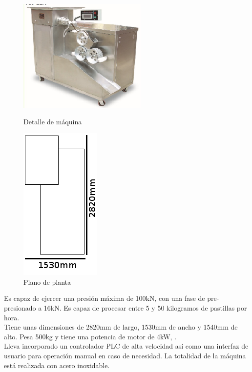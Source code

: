 	\begin{figure}[htp]
		\begin{minipage}{.48\textwidth}
			\centering
			\includegraphics[scale=1]{Datasheets/2MaquinaPrensadoFoto.png}
			\caption{Detalle de máquina}
			\label{fig:testa}
		\end{minipage}
		\begin{minipage}{.48\textwidth}
			\centering
			\includegraphics[scale=0.8]{Datasheets/Miniaturas/compresion.png}
			\caption{Plano de planta}
			\label{fig:testb}
		\end{minipage}
	\end{figure}
		

	Es capaz de ejercer una presión máxima de 100kN, con una fase de pre-presionado a 16kN. Es capaz de procesar entre 5 y 50 kilogramos de pastillas por hora. \\

	Tiene unas dimensiones de 2820mm de largo, 1530mm de ancho y 1540mm de alto. Pesa 500kg y tiene una potencia de motor de 4kW, .\\

	Lleva incorporado un controlador PLC de alta velocidad así como una interfaz de usuario para operación manual en caso de necesidad. La totalidad de la máquina está realizada con acero inoxidable. 


